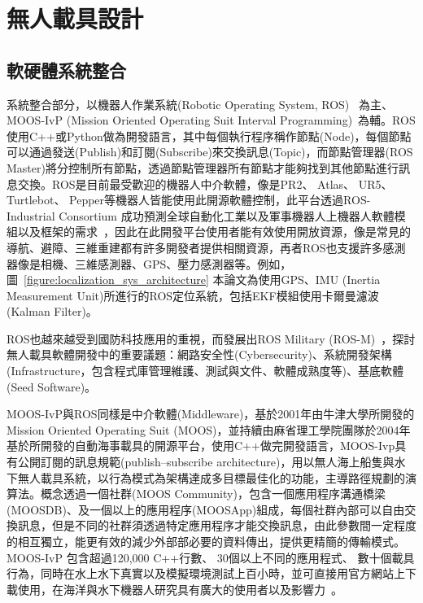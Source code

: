 \section{無人載具設計}

\subsection{軟硬體系統整合}

系統整合部分，以機器人作業系統(Robotic Operating System, ROS)~\cite{quigley2009ros} 為主、MOOS-IvP (Mission Oriented Operating Suit Interval Programming)~\cite{benjamin2009overview}為輔。ROS使用C++或Python做為開發語言，其中每個執行程序稱作節點(Node)，每個節點可以通過發送(Publish)和訂閱(Subscribe)來交換訊息(Topic)，而節點管理器(ROS Master)將分控制所有節點，透過節點管理器所有節點才能夠找到其他節點進行訊息交換。ROS是目前最受歡迎的機器人中介軟體，像是PR2、 Atlas、 UR5、 Turtlebot、 Pepper等機器人皆能使用此開源軟體控制，此平台透過ROS-Industrial Consortium 成功預測全球自動化工業以及軍事機器人上機器人軟體模組以及框架的需求~\cite{edwards2012ros}，因此在此開發平台使用者能有效使用開放資源，像是常見的導航、避障、三維重建都有許多開發者提供相關資源，再者ROS也支援許多感測器像是相機、三維感測器、GPS、壓力感測器等。例如，圖~\ref{figure:localization_sys_architecture} 本論文為使用GPS、IMU (Inertia Measurement Unit)所進行的ROS定位系統，包括EKF模組使用卡爾曼濾波 (Kalman Filter)。

ROS也越來越受到國防科技應用的重視，而發展出ROS Military (ROS-M)~\cite{towlerros}，探討無人載具軟體開發中的重要議題：網路安全性(Cybersecurity)、系統開發架構(Infrastructure，包含程式庫管理維護、測試與文件、軟體成熟度等)、基底軟體(Seed Software)。

MOOS-IvP與ROS同樣是中介軟體(Middleware)，基於2001年由牛津大學所開發的Mission Oriented Operating Suit (MOOS)，並持續由麻省理工學院團隊於2004年基於所開發的自動海事載具的開源平台，使用C++做完開發語言，MOOS-Ivp具有公開訂閱的訊息規範(publish–subscribe architecture)，用以無人海上船隻與水下無人載具系統，以行為模式為架構達成多目標最佳化的功能，主導路徑規劃的演算法。概念透過一個社群(MOOS Community)，包含一個應用程序溝通橋梁(MOOSDB)、及一個以上的應用程序(MOOSApp)組成，每個社群內部可以自由交換訊息，但是不同的社群須透過特定應用程序才能交換訊息，由此參數間一定程度的相互獨立，能更有效的減少外部部必要的資料傳出，提供更精簡的傳輸模式。MOOS-IvP 包含超過120,000 C++行數、 30個以上不同的應用程式、 數十個載具行為，同時在水上水下真實以及模擬環境測試上百小時，並可直接用官方網站上下載使用，在海洋與水下機器人研究具有廣大的使用者以及影響力~\cite{moosivp2017ntu}。 

